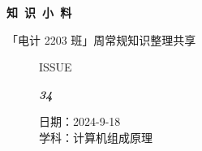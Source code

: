 \documentclass[UTF8]{ctexart}
\newcommand\Black[1]{\textcolor[gray]{0.3}{#1}}
\newcommand\Brown[1]{\textcolor[HTML]{998A4E}{#1}}
\newcommand\IssueNumber{34}
\newcommand\Date{2024-9-18}
\newcommand\Subject{计算机组成原理}
\begin{document}
\BgThispage
\begin{center}
\phantom{...}

{\Large\textcolor{brown!40!white}{}}

\vspace{-2em}

{\Huge\bfseries\TitleFont \Black{知\ 识\ 小\ 料}}


\vspace{-0.1cm}
{\footnotesize \Brown{「电计 2203 班」周常规知识整理共享}}
\end{center}

\vspace{-0.5cm}


\begin{figure}[H]
\hspace{1cm}
\begin{minipage}[t]{0.3\textwidth}
\centering
    \Brown{\Genshin ISSUE}

    \vspace{-0.6cm}
    \Huge \Issue\slshape\bfseries\Black{\IssueNumber}
\end{minipage}
\hfill
\begin{minipage}[t]{0.35\textwidth}
\centering
    \Brown{日期：\Date} \\
\vspace{-0.1cm}
    \Brown{学科：\Subject} \\
\end{minipage}
\hspace{0.8cm}
\end{figure}
\end{document}
